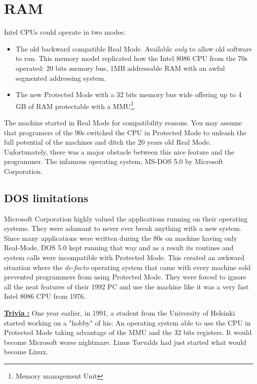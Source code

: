 \documentclass[book.tex]{subfiles}
\begin{document}
\section{RAM}
Intel CPUs could operate in two modes:
\begin{itemize}
  \item The old backward compatible Real Mode. Available \emph{only} to allow old software to run. This memory model replicated how the Intel 8086 CPU from the 70s operated: 20 bits memory bus, 1MB addressable RAM with an awful segmented addressing system.
  \item The new Protected Mode with a 32 bits memory bus wide offering up to 4 GB of RAM protectable with a MMU\footnote{Memory management Unit}.
\end{itemize}
The machine started in Real Mode for compatibility reasons. You may assume that programers of the 90s switched the CPU in Protected Mode to unleash the full potential of the machines and ditch the 20 years old Real Mode. Unfortunately, there was a major obstacle between this nice feature and the programmer. The infamous operating system, MS-DOS 5.0 by Microsoft Corporation.
  






  \subsection{DOS limitations}
  Microsoft Corporation highly valued the applications running on their operating systems. They were adamant to never ever break anything with a new system.  Since many applications were written during the 80s on machine having only Real-Mode, DOS 5.0 kept running that way and as a result its routines and system calls were incompatible with Protected Mode. This created an awkward situation where the \emph{de-facto} operating system that came with every machine sold prevented programmers from using Protected Mode. They were forced to ignore all the neat features of their 1992 PC and use the machine like it was a very fast Intel 8086 CPU from 1976.

\bigskip

 \textbf{\underline{Trivia :}} One year earlier, in 1991, a student from the University of Helsinki started working on a "hobby" of his: An operating system able to use the CPU in Protected Mode taking advantage of the MMU and the 32 bits registers. It would become Microsoft worse nightmare. Linus Torvalds had just started what would become Linux.
\end{document}
